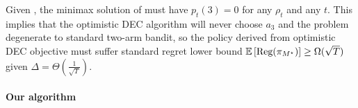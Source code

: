 

Given , the minimax solution of  must have $p_t(3) = 0$ for any $\rho_t$ and any $t$. This implies that the optimistic DEC algorithm will never choose $a_3$ and the problem degenerate to standard two-arm bandit, so the policy derived from optimistic DEC objective  must suffer standard regret lower bound $\mathbb{E}\left[\text{\rm Reg}(\pi_{M^\star})\right] \ge \Omega(\sqrt{T})$ given $\Delta = \Theta\left(\frac{1}{\sqrt{T}}\right)$.

\paragraph{Our algorithm}




